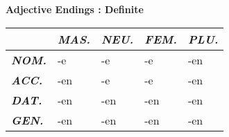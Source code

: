 \documentclass[a4paper,twocolumn,10pt]{article}
\newcommand{\tabularxtable}[3]
{

	\vspace{0.5cm}
	\nolinenumbers

	\begin{tabularx}{#1}{#2}
		#3
	\end{tabularx}

	\linenumbers
	\vspace{0.5cm}
}
\begin{document}
\textbf {Adjective Endings : Definite}
\tabularxtable
{0.99\linewidth}
{l|XXXX}
{

&
\cellcolor{table-subtopic} \textbf{\textit{MAS.}} &
\cellcolor{table-subtopic} \textbf{\textit{NEU.}}  &
\cellcolor{table-subtopic} \textbf{\textit{FEM.}}  &
\cellcolor{table-subtopic} \textbf{\textit{PLU.}} \\
\midrule

\cellcolor{table-subtopic} \textbf{\textit{NOM.}} &
\cellcolor{cell-lightred}  -e                &
\cellcolor{cell-lightred}  -e                &
\cellcolor{cell-lightred}  -e                &
\cellcolor{cell-lightblue} -en \\

\cellcolor{table-subtopic} \textbf{\textit{ACC.}} &
\cellcolor{cell-lightblue} -en               &
\cellcolor{cell-lightred}  -e                &
\cellcolor{cell-lightred}  -e                &
\cellcolor{cell-lightblue} -en \\

\cellcolor{table-subtopic} \textbf{\textit{DAT.}} &
\cellcolor{cell-lightblue} -en               &
\cellcolor{cell-lightblue} -en               &
\cellcolor{cell-lightblue} -en               &
\cellcolor{cell-lightblue} -en \\

\cellcolor{table-subtopic} \textbf{\textit{GEN.}} &
\cellcolor{cell-lightblue} -en               &
\cellcolor{cell-lightblue} -en               &
\cellcolor{cell-lightblue} -en               &
\cellcolor{cell-lightblue} -en \\




}


\end{document}
